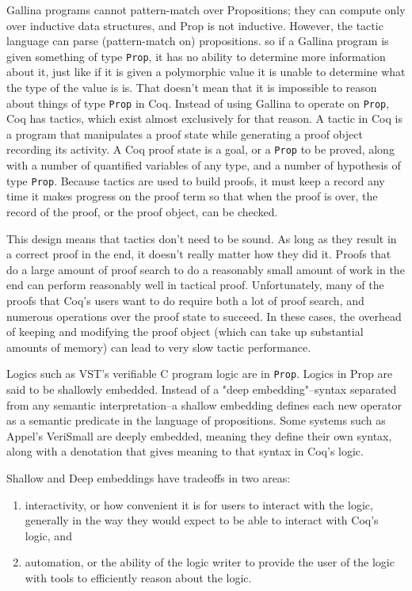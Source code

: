 \documentclass{puthesis}
\begin{document}
\noindent 
Gallina programs cannot pattern-match over Propositions; they can
compute only over inductive data structures, and Prop is not
inductive.  However, the tactic language can parse (pattern-match on)
propositions.  so if a Gallina program is given something of type
\lstinline|Prop|, it has no ability to determine more information
about it, just like if it is given a polymorphic value it is unable to
determine what the type of the value is is. That doesn't mean that it
is impossible to reason about things of type \lstinline|Prop| in
Coq. Instead of using Gallina to operate on \lstinline|Prop|, Coq has
tactics, which exist almost exclusively for that reason. A tactic in
Coq is a program that manipulates a proof state while generating a
proof object recording its activity. A Coq proof state is a goal, or a
\lstinline|Prop| to be proved, along with a number of quantified
variables of any type, and a number of hypothesis of type
\lstinline|Prop|. Because tactics are used to build proofs, it must
keep a record any time it makes progress on the proof term so that
when the proof is over, the record of the proof, or the proof object,
can be checked.

This design means that tactics don't need to be sound. As long as they
result in a correct proof in the end, it doesn't really matter how
they did it. Proofs that do a large amount of proof search to do a
reasonably small amount of work in the end can perform reasonably well
in tactical proof. Unfortunately, many of the proofs that Coq's users
want to do require both a lot of proof search, and numerous operations
over the proof state to succeed. In these cases, the overhead of
keeping and modifying the proof object (which can take up substantial
amounts of memory) can lead to very slow tactic performance.

Logics such as VST's verifiable C program logic are in
\lstinline|Prop|. Logics in Prop are said to be shallowly embedded.
Instead of a "deep embedding"--syntax separated from any semantic
interpretation--a shallow embedding defines each new operator as a
semantic predicate in the language of propositions.  Some systems
such as Appel's VeriSmall \cite{} are deeply embedded, meaning they
define their own syntax, along with a denotation that gives meaning to
that syntax in Coq's logic.

Shallow and Deep embeddings have tradeoffs in two areas:

\begin{enumerate}
\item interactivity, or how convenient it is for users to interact
  with the logic, generally in the way they would expect to be able to
  interact with Coq's logic, and
\item automation, or the ability of the logic writer to provide the
  user of the logic with tools to efficiently reason about the logic.
\end{enumerate}
\end{document}

